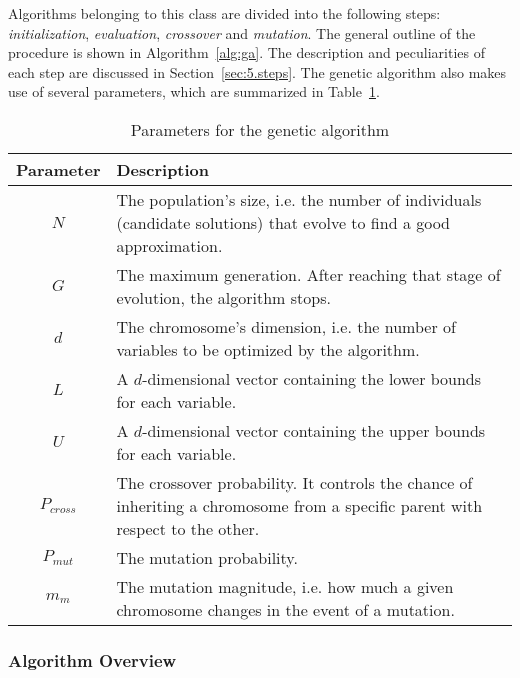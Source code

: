Algorithms belonging to this class are divided into the following steps:
\textit{initialization}, \textit{evaluation}, \textit{crossover} and \textit{mutation}.
The general outline of the procedure is shown in Algorithm~\ref{alg:ga}.
The description and peculiarities of each step are discussed in Section~\ref{sec:5.steps}.
The genetic algorithm also makes use of several parameters, which are summarized
in Table~\ref{tab:ga_params}.


\begin{table}[]
	\centering
	\begin{tabularx}{\linewidth}{c X}
		\toprule
		\textbf{Parameter} & \textbf{Description} \\ \midrule
		$N$        & The population's size, i.e. the number of individuals (candidate solutions) that evolve to find a good approximation. \\
		$G$         & The maximum generation. After reaching that stage of evolution, the algorithm stops. \\
		$d$           	   & The chromosome's dimension, i.e. the number of variables to be optimized by the algorithm. \\
		$L$           	   & A $d$-dimensional vector containing the lower bounds for each variable. \\
		$U$				   & A $d$-dimensional vector containing the upper bounds for each variable. \\
		$P_{cross}$		   & The crossover probability. It controls the chance of inheriting a chromosome from a specific parent with respect to the other. \\
		$P_{mut}$		   & The mutation probability. \\
		$m_m$			   & The mutation magnitude, i.e. how much a given chromosome changes in the event of a mutation. \\ \bottomrule
	\end{tabularx}
	\caption{Parameters for the genetic algorithm}
	\label{tab:ga_params}
\end{table}

\subsubsection{Algorithm Overview}

